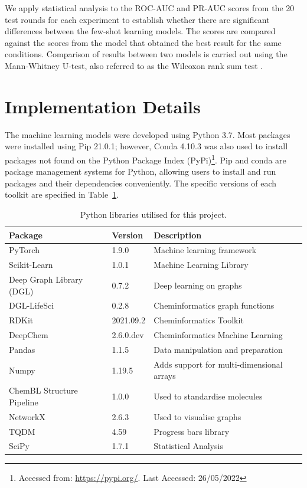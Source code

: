We apply statistical analysis to the ROC-AUC and PR-AUC scores from the 20 test rounds for each experiment to establish whether there are significant differences between the few-shot learning models. The scores are compared against the scores from the model that obtained the best result for the same conditions. Comparison of results between two models is carried out using the Mann-Whitney U-test, also referred to as the Wilcoxon rank sum test \citep{mann1947test}.

\section{Implementation Details}

The machine learning models were developed using Python 3.7. Most packages were installed using Pip 21.0.1; however, Conda 4.10.3 was also used to install packages not found on the Python Package Index (PyPi)\footnote{Accessed from: \url{https://pypi.org/}. Last Accessed: 26/05/2022}. Pip and conda are package management systems for Python, allowing users to install and run packages and their dependencies conveniently. The specific versions of each toolkit are specified in Table~\ref{tab:versions}.

\begin{table}
    \centering
    \begin{tabular}{@{}lll@{}}
        \hline
        \textbf{Package} & \textbf{Version} & \textbf{Description} \\
        \hline
        PyTorch & 1.9.0 & Machine learning framework \\
        Scikit-Learn & 1.0.1 & Machine Learning Library \\
        Deep Graph Library (DGL) & 0.7.2 & Deep learning on graphs \\
        DGL-LifeSci & 0.2.8 & Cheminformatics graph functions \\
        RDKit & 2021.09.2 & Cheminformatics Toolkit \\
        DeepChem & 2.6.0.dev & Cheminformatics Machine Learning \\
        Pandas & 1.1.5 & Data manipulation and preparation \\
        Numpy & 1.19.5 & Adds support for multi-dimensional arrays \\
        ChemBL Structure Pipeline & 1.0.0 & Used to standardise molecules \\
        NetworkX & 2.6.3 & Used to visualise graphs \\
        TQDM & 4.59 & Progress bars library \\
        SciPy & 1.7.1 & Statistical Analysis \\
        \hline
    \end{tabular}
    \caption{Python libraries utilised for this project.}
    \label{tab:versions}
\end{table}

